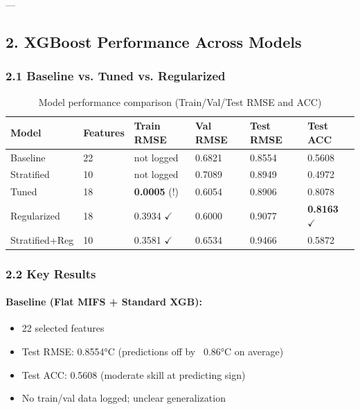 \documentclass[12pt,a4paper]{article}
\begin{document}
---

\subsection*{2. XGBoost Performance Across Models}

\subsubsection*{2.1 Baseline vs. Tuned vs. Regularized}

\begin{table}[H]
\centering
\begin{tabular}{llllll}
\toprule
\textbf{Model} & \textbf{Features} & \textbf{Train RMSE} & \textbf{Val RMSE} & \textbf{Test RMSE} & \textbf{Test ACC} \\
\midrule
Baseline & 22 & not logged & 0.6821 & 0.8554 & 0.5608 \\
Stratified & 10 & not logged & 0.7089 & 0.8949 & 0.4972 \\
Tuned & 18 & \textbf{0.0005} (!) & 0.6054 & 0.8906 & 0.8078 \\
Regularized & 18 & 0.3934 $\checkmark$ & 0.6000 & 0.9077 & \textbf{0.8163} $\checkmark$ \\
Stratified+Reg & 10 & 0.3581 $\checkmark$ & 0.6534 & 0.9466 & 0.5872 \\
\bottomrule
\end{tabular}
\caption{Model performance comparison (Train/Val/Test RMSE and ACC)}
\end{table}

\subsubsection*{2.2 Key Results}

\paragraph{Baseline (Flat MIFS + Standard XGB):}
\begin{itemize}
    \item 22 selected features
    \item Test RMSE: 0.8554°C (predictions off by ~0.86°C on average)
    \item Test ACC: 0.5608 (moderate skill at predicting sign)
    \item No train/val data logged; unclear generalization
\end{itemize}
\end{document}
